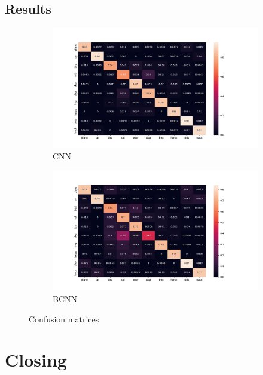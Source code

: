 \documentclass[12pt]{article}
\begin{document}
\subsection{Results}

\begin{figure}[H]
	\centering
	\begin{subfigure}{.5\textwidth}
		\centering
		\includegraphics[width=.9\linewidth]{../Images/CNN_confusion_matrix}
		\caption{CNN}
	\end{subfigure}%
	\begin{subfigure}{.5\textwidth}
		\centering
		\includegraphics[width=.9\linewidth]{../Images/BNN_confusion_matrix}
		\caption{BCNN}
	\end{subfigure}
	\caption{Confusion matrices}
\end{figure}

\section{Closing}



\newpage

\printbibliography
\end{document}
